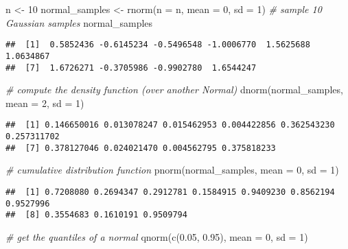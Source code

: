 \documentclass[
  oneside]{book}
\newenvironment{Shaded}{\begin{snugshade}}{\end{snugshade}}
\newcommand{\AttributeTok}[1]{\textcolor[rgb]{0.77,0.63,0.00}{#1}}
\newcommand{\CommentTok}[1]{\textcolor[rgb]{0.56,0.35,0.01}{\textit{#1}}}
\newcommand{\DecValTok}[1]{\textcolor[rgb]{0.00,0.00,0.81}{#1}}
\newcommand{\FloatTok}[1]{\textcolor[rgb]{0.00,0.00,0.81}{#1}}
\newcommand{\FunctionTok}[1]{\textcolor[rgb]{0.00,0.00,0.00}{#1}}
\newcommand{\NormalTok}[1]{#1}
\newcommand{\OtherTok}[1]{\textcolor[rgb]{0.56,0.35,0.01}{#1}}
\begin{document}
\begin{Shaded}
\begin{Highlighting}[]
\NormalTok{n }\OtherTok{\textless{}{-}} \DecValTok{10}
\NormalTok{normal\_samples }\OtherTok{\textless{}{-}} \FunctionTok{rnorm}\NormalTok{(}\AttributeTok{n =}\NormalTok{ n, }\AttributeTok{mean =} \DecValTok{0}\NormalTok{, }\AttributeTok{sd =} \DecValTok{1}\NormalTok{) }\CommentTok{\# sample 10 Gaussian samples}
\NormalTok{normal\_samples}
\end{Highlighting}
\end{Shaded}

\begin{verbatim}
##  [1]  0.5852436 -0.6145234 -0.5496548 -1.0006770  1.5625688  1.0634867
##  [7]  1.6726271 -0.3705986 -0.9902780  1.6544247
\end{verbatim}

\begin{Shaded}
\begin{Highlighting}[]
\CommentTok{\# compute the density function (over another Normal)}
\FunctionTok{dnorm}\NormalTok{(normal\_samples, }\AttributeTok{mean =} \DecValTok{2}\NormalTok{, }\AttributeTok{sd =} \DecValTok{1}\NormalTok{)}
\end{Highlighting}
\end{Shaded}

\begin{verbatim}
##  [1] 0.146650016 0.013078247 0.015462953 0.004422856 0.362543230 0.257311702
##  [7] 0.378127046 0.024021470 0.004562795 0.375818233
\end{verbatim}

\begin{Shaded}
\begin{Highlighting}[]
\CommentTok{\# cumulative distribution function}
\FunctionTok{pnorm}\NormalTok{(normal\_samples, }\AttributeTok{mean =} \DecValTok{0}\NormalTok{, }\AttributeTok{sd =} \DecValTok{1}\NormalTok{)}
\end{Highlighting}
\end{Shaded}

\begin{verbatim}
##  [1] 0.7208080 0.2694347 0.2912781 0.1584915 0.9409230 0.8562194 0.9527996
##  [8] 0.3554683 0.1610191 0.9509794
\end{verbatim}

\begin{Shaded}
\begin{Highlighting}[]
\CommentTok{\# get the quantiles of a normal}
\FunctionTok{qnorm}\NormalTok{(}\FunctionTok{c}\NormalTok{(}\FloatTok{0.05}\NormalTok{, }\FloatTok{0.95}\NormalTok{), }\AttributeTok{mean =} \DecValTok{0}\NormalTok{, }\AttributeTok{sd =} \DecValTok{1}\NormalTok{)}
\end{Highlighting}
\end{Shaded}
\end{document}
